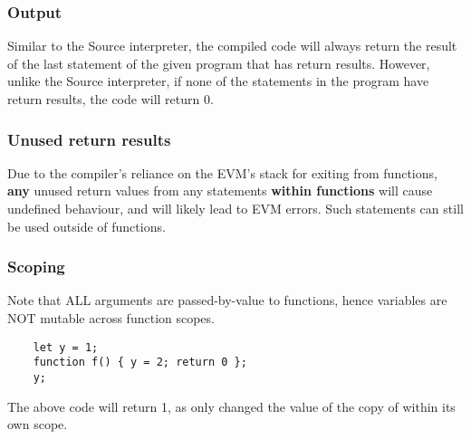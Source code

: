 \subsubsection{Output}
Similar to the Source interpreter, the compiled code will always return the result of the last statement of the given program that has return results. However, unlike the Source interpreter, if none of the statements in the program have return results, the code will return 0. 

\subsubsection{Unused return results}
Due to the compiler's reliance on the EVM's stack for exiting from functions, \textbf{any} unused return values from any statements \textbf{within functions} will cause undefined behaviour, and will likely lead to EVM errors. Such statements can still be used outside of functions.



\subsubsection{Scoping}
Note that ALL arguments are passed-by-value to functions, hence variables are NOT mutable across function scopes. 
\begin{verbatim}
    let y = 1;
    function f() { y = 2; return 0 };
    y;
\end{verbatim}
The above code will return 1, as  only changed the value of the copy of  within its own scope. 

